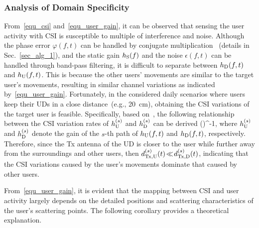 \subsubsection{Analysis of Domain Specificity} \label{s3ec_influence}
From~\eqref{equ_csi} and~\eqref{equ_user_gain}, it can be observed that sensing the user activity with CSI is susceptible to multiple of interference and noise.
Although the phase error $\varphi(f,t)$ can be handled by conjugate multiplication~\cite{Li17Ubicomp_IndoTrack} (details in Sec.~\ref{sec_alg_1}), and the static gain $h_{\mathrm{S}}(f)$ and the noise $\epsilon(f, t)$ can be handled through band-pass filtering, it is difficult to separate between $h_{\mathrm{D}}(f,t)$ and $h_{\mathrm{U}}(f,t)$.
This is because the other users' movements are similar to the target user's movements, resulting in similar channel variations as indicated by~\eqref{equ_user_gain}.
Fortunately, in the considered daily scenarios where users keep their UDs in a close distance~(e.g., 20\!~cm), obtaining the CSI variations of the target user is feasible.
Specifically, based on~\cite[Eqn. (4)]{Hu2023Mobicom_Muse}, the following relationship between the CSI variation rates of  $ h_{\mathrm{U}}^{(s)}$ and $ h_{\mathrm{D}}^{(s)}$ can be derived
\beq
\label{equ_powerRatio_prop}
 \propto
    \Big(\Big)^{-1},
\eeq
where $h_{\mathrm{U}}^{(s)}$ and $h_{\mathrm{D}}^{(s)}$ denote the gain of the $s$-th path of $h_{\mathrm{U}}(f,t)$ and $h_{\mathrm{D}}(f,t)$, respectively.
Therefore, since the Tx antenna of the UD is closer to the user while further away from the surroundings and other users, then $d_{\mathrm{Tx}, \mathrm{U}}^{(s)}(t)\!\ll\! d_{\mathrm{Tx}, \mathrm{D}}^{(s)}(t)$, indicating that the CSI variations caused by the user's movements dominate that caused by other users. 

From~\eqref{equ_user_gain}, it is evident that the mapping between CSI and user activity largely depends on the detailed positions and scattering characteristics of the user's scattering points.
The following corollary provides a theoretical explanation.

